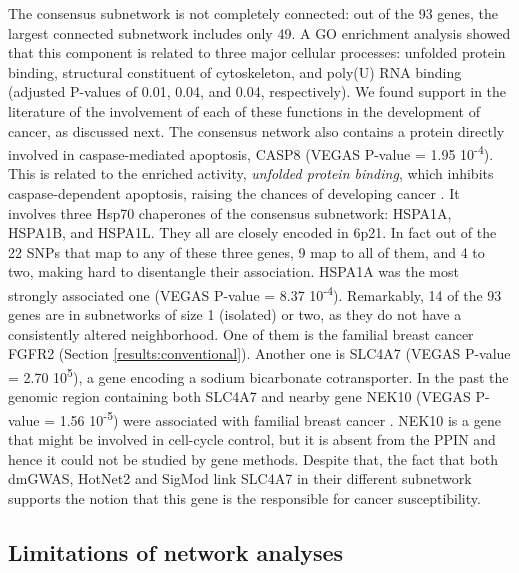 \documentclass[twocolumn, 10pt]{article}
\begin{document}
The consensus subnetwork is not completely connected: out of the 93 genes, the largest connected subnetwork includes only 49. A GO enrichment analysis showed that this component is related to three major cellular processes: unfolded protein binding, structural constituent of cytoskeleton, and poly(U) RNA binding (adjusted P-values of 0.01, 0.04, and 0.04, respectively). We found support in the literature of the involvement of each of these functions in the development of cancer, as discussed next. The consensus network also contains a protein directly involved in caspase-mediated apoptosis, CASP8 (VEGAS P-value = 1.95 \texttimes{} 10\textsuperscript{-4}). This is related to the enriched activity, \emph{unfolded protein binding}, which inhibits caspase-dependent apoptosis, raising the chances of developing cancer \cite{calderwood_heat_2016}. It involves three Hsp70 chaperones of the consensus subnetwork: HSPA1A, HSPA1B, and HSPA1L. They all are closely encoded in 6p21. In fact out of the 22 SNPs that map to any of these three genes, 9 map to all of them, and 4 to two, making hard to disentangle their association. HSPA1A was the most strongly associated one (VEGAS P-value = 8.37 \texttimes{} 10\textsuperscript{-4}). Remarkably, 14 of the 93 genes are in subnetworks of size 1 (isolated) or two, as they do not have a consistently altered neighborhood. One of them is the familial breast cancer FGFR2 (Section \ref{results:conventional}). Another one is SLC4A7 (VEGAS P-value = 2.70 \texttimes{} 10\textsuperscript{5}), a gene encoding a sodium bicarbonate cotransporter. In the past the genomic region containing both SLC4A7 and nearby gene NEK10 (VEGAS P-value = 1.56 \texttimes{} 10\textsuperscript{-5}) were associated with familial breast cancer \cite{ahmed_newly_2009}. NEK10 is a gene that might be involved in cell-cycle control, but it is absent from the PPIN and hence it could not be studied by gene methods. Despite that, the fact that both dmGWAS, HotNet2 and SigMod link SLC4A7 in their different subnetwork supports the notion that this gene is the responsible for cancer susceptibility. 

\subsection{Limitations of network analyses}
\label{sec:org73465bb}
\end{document}
